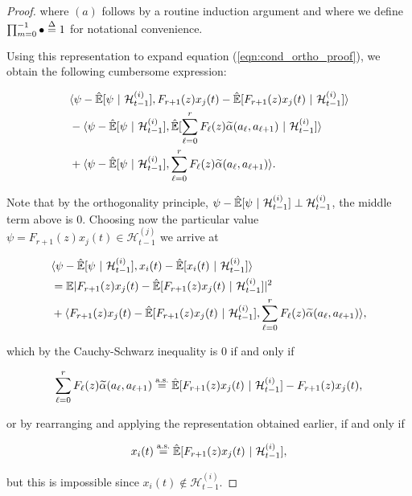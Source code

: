 \documentclass[12pt]{article}
\def\H{\mathcal{H}}  %
\newcommand{\linE}[2]{\hat{\E}[#1\ |\ #2]}  %
\newcommand{\wtalpha}[2]{\widetilde{\alpha}(#1, #2)}  %
\begin{document}
\begin{proof}
  where $(a)$ follows by a routine induction argument and where we define $\prod_{m = 0}^{-1} \bullet \overset{\Delta}{=} 1$ for notational convenience.

  Using this representation to expand equation (\ref{eqn:cond_ortho_proof}), we obtain the following cumbersome expression:

  \begin{align*}
    &\inner{\psi - \linE{\psi}{\H_{t - 1}^{(i)}}}{F_{r + 1}(z)x_j(t) - \linE{F_{r + 1}(z)x_j(t)}{\H_{t - 1}^{(i)}}}\\
    &- \inner{\psi - \linE{\psi}{\H_{t - 1}^{(i)}}}{\linE{\sum_{\ell = 0}^r F_\ell(z)\wtalpha{a_\ell}{a_{\ell + 1}}}{\H_{t - 1}^{(i)}}}\\
    &+ \inner{\psi - \linE{\psi}{\H_{t - 1}^{(i)}}}{\sum_{\ell = 0}^r F_\ell(z)\wtalpha{a_\ell}{a_{\ell + 1}}}.
  \end{align*}

  Note that by the orthogonality principle, $\psi - \linE{\psi}{\H_{t - 1}^{(i)}} \perp \H_{t - 1}^{(i)}$, the middle term above is $0$.  Choosing now the particular value $\psi = F_{r + 1}(z)x_j(t) \in \H_{t - 1}^{(j)}$ we arrive at

  \begin{align*}
    &\inner{\psi - \linE{\psi}{\H_{t - 1}^{(i)}}}{x_i(t) - \linE{x_i(t)}{\H_{t - 1}^{(i)}}}\\
    &= \E|F_{r + 1}(z)x_j(t) - \linE{F_{r + 1}(z)x_j(t)}{\H_{t - 1}^{(i)}}|^2\\
    &+ \inner{F_{r + 1}(z)x_j(t) - \linE{F_{r + 1}(z)x_j(t)}{\H_{t - 1}^{(i)}}}{\sum_{\ell = 0}^r F_\ell(z) \wtalpha{a_\ell}{a_{\ell + 1}}},
  \end{align*}

  which by the Cauchy-Schwarz inequality is $0$ if and only if

  \begin{equation*}
    \sum_{\ell = 0}^r F_\ell(z) \wtalpha{a_\ell}{a_{\ell + 1}} \overset{\text{a.s.}}{=} \linE{F_{r + 1}(z)x_j(t)}{\H_{t - 1}^{(i)}} - F_{r + 1}(z)x_j(t),
  \end{equation*}

  or by rearranging and applying the representation obtained earlier, if and only if

  \begin{equation*}
    x_i(t) \overset{\text{a.s.}}{=} \linE{F_{r + 1}(z)x_j(t)}{\H_{t - 1}^{(i)}},
  \end{equation*}

  but this is impossible since $x_i(t) \not \in \H_{t - 1}^{(i)}$.
\end{proof}
\end{document}

